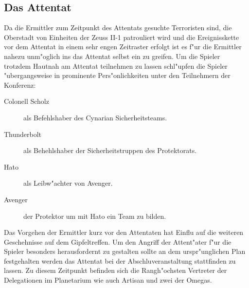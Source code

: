 \subsection{Das Attentat} 
Da die Ermittler zum Zeitpunkt des Attentats gesuchte Terroristen sind, die Oberstadt von Einheiten der Zeuss II-1 patrouliert wird und die
Ereignisskette vor dem Attentat in einem sehr engen Zeitraster erfolgt ist es f"ur die Ermittler nahezu unm"oglich ins das Attentat selbst ein zu greifen. Um die Spieler trotzdem Hautnah am Attentat teilnehmen zu lassen schl"upfen die Spieler "ubergangsweise in prominente Pers"onlichkeiten unter den Teilnehmern der Konferenz:

\begin{description}
	\item[Colonell Scholz] als Befehlshaber des Cynarian Sicherheitsteams.
	\item[Thunderbolt] als Behehlshaber der Sicherheitstruppen des Protektorats.
	\item[Hato] als Leibw"achter von Avenger.
	\item[Avenger] der Protektor um mit Hato ein Team zu bilden.
\end{description}

Das Vorgehen der Ermittler kurz vor den Attentaten hat Einflu\3 auf die weiteren Geschehnisse auf dem Gipfeltreffen. Um den Angriff der Attent"ater f"ur die Spieler besonders herausfordernt zu gestalten sollte an dem urspr"unglichen Plan festgehalten werden das Attentat bei der Abschlu\3veranstaltung stattfinden zu lassen. Zu diesem Zeitpunkt befinden sich die Rangh"ochsten Vertreter der Delegationen im Planetarium wie auch Artisan und zwei der Omegas.

